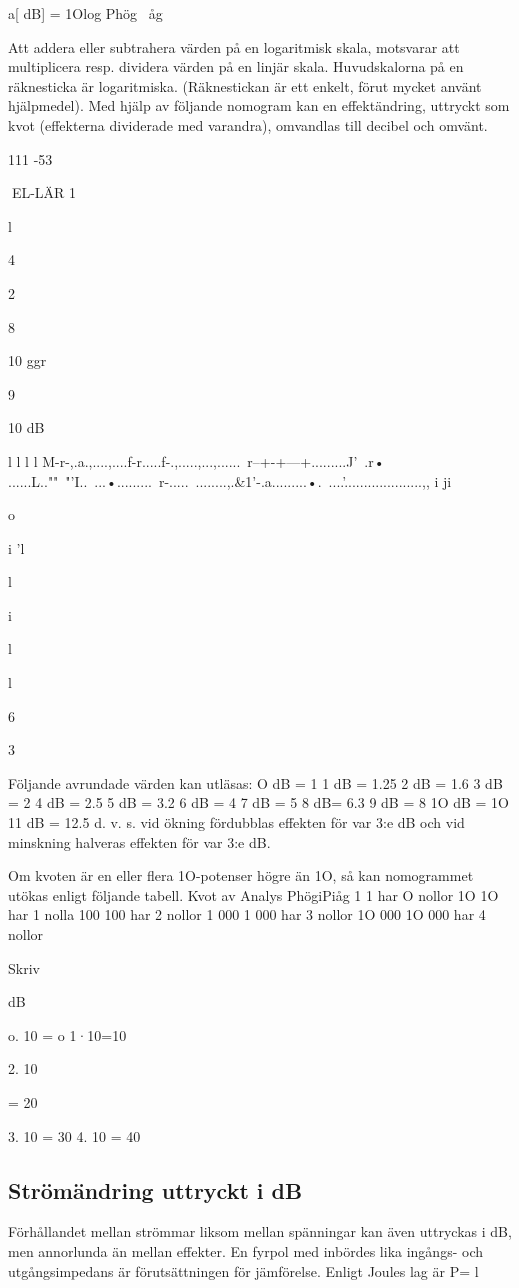 {{a[ dB] = 1Olog Phög
~åg

Att addera eller subtrahera värden på en
logaritmisk skala, motsvarar att multiplicera
resp. dividera värden på en linjär skala.
Huvudskalorna på en räknesticka är logaritmiska. (Räknestickan är ett enkelt, förut
mycket använt hjälpmedel).
Med hjälp av följande nomogram kan en
effektändring, uttryckt som kvot (effekterna
dividerade med varandra), omvandlas till
decibel och omvänt.

111 -53

EL-LÄR
1

l

4

2

8

10 ggr

9

10 dB

l
l
l
l
M-r-,.a.,....,....f-r.....f-.,.....,...,......~r--+-+---+.........J'~.r•
......L..""~"'I..~...•.........~r-.....~........,.\&1'-.a.........•.~....'....................,,
i ji

o

i 'l

l

i

l

l

6

3

Följande avrundade värden kan utläsas:
O dB = 1
1 dB = 1.25 2 dB = 1.6
3 dB = 2
4 dB = 2.5
5 dB = 3.2
6 dB = 4
7 dB = 5
8 dB= 6.3
9 dB = 8
1O dB = 1O 11 dB = 12.5
d. v. s. vid ökning fördubblas effekten för var
3:e dB och vid minskning halveras effekten
för var 3:e dB.

Om kvoten är en eller flera 1O-potenser
högre än 1O, så kan nomogrammet utökas
enligt följande tabell.
Kvot av Analys
PhögiPiåg
1
1 har O nollor
1O
1O har 1 nolla
100
100 har 2 nollor
1 000
1 000 har 3 nollor
1O 000 1O 000 har 4 nollor

Skriv

dB

o. 10 = o
1·10=10

2. 10

= 20

3. 10 = 30
4. 10 = 40

\subsection{Strömändring uttryckt i dB}
Förhållandet mellan strömmar liksom mellan spänningar kan även uttryckas i dB, men
annorlunda än mellan effekter. En fyrpol
med inbördes lika ingångs- och utgångsimpedans är förutsättningen för jämförelse.
Enligt Joules lag är P= l

}}
